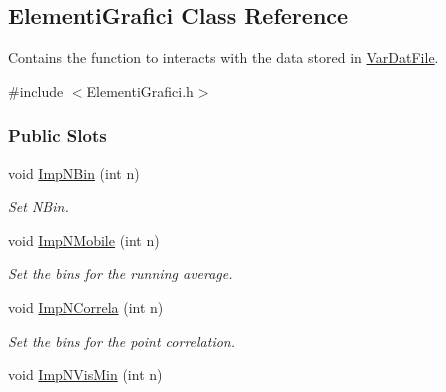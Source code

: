 \hypertarget{classElementiGrafici}{\subsection{\-Elementi\-Grafici \-Class \-Reference}
\label{classElementiGrafici}
}


\-Contains the function to interacts with the data stored in \hyperlink{classVarDatFile}{\-Var\-Dat\-File}.  




{\ttfamily \#include $<$\-Elementi\-Grafici.\-h$>$}

\subsubsection*{\-Public \-Slots}
\begin{DoxyCompactItemize}
\item 
\hypertarget{classElementiGrafici_a3584d9fda1661c9d984821a0ff2da530}{void \hyperlink{classElementiGrafici_a3584d9fda1661c9d984821a0ff2da530}{\-Imp\-N\-Bin} (int n)}\label{classElementiGrafici_a3584d9fda1661c9d984821a0ff2da530}

\begin{DoxyCompactList}\small\item\em \-Set \-N\-Bin. \end{DoxyCompactList}\item 
\hypertarget{classElementiGrafici_acf8b3f1f0d2c774fac0dc94d45d08b14}{void \hyperlink{classElementiGrafici_acf8b3f1f0d2c774fac0dc94d45d08b14}{\-Imp\-N\-Mobile} (int n)}\label{classElementiGrafici_acf8b3f1f0d2c774fac0dc94d45d08b14}

\begin{DoxyCompactList}\small\item\em \-Set the bins for the running average. \end{DoxyCompactList}\item 
\hypertarget{classElementiGrafici_a1f447e7c93ae89ef6e13cca8f2076e94}{void \hyperlink{classElementiGrafici_a1f447e7c93ae89ef6e13cca8f2076e94}{\-Imp\-N\-Correla} (int n)}\label{classElementiGrafici_a1f447e7c93ae89ef6e13cca8f2076e94}

\begin{DoxyCompactList}\small\item\em \-Set the bins for the point correlation. \end{DoxyCompactList}\item 
\hypertarget{classElementiGrafici_a234790a4188b9c368be09d366b2b89cc}{void \hyperlink{classElementiGrafici_a234790a4188b9c368be09d366b2b89cc}{\-Imp\-N\-Vis\-Min} (int n)}\label{classElementiGrafici_a234790a4188b9c368be09d366b2b89cc}


\end{DoxyCompactItemize}
